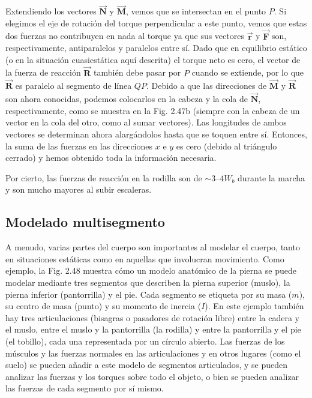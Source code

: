 \documentclass[12pt]{book}
\begin{document}
Extendiendo los vectores $\vec{\mathbf{N}}$ y $\vec{\mathbf{M}}$, vemos que se intersectan en el punto $P$. Si elegimos el eje de rotación del torque perpendicular a este punto, vemos que estas dos fuerzas no contribuyen en nada al torque ya que sus vectores $\vec{\mathbf{r}}$ y $\vec{\mathbf{F}}$ son, respectivamente, antiparalelos y paralelos entre sí. Dado que en equilibrio estático (o en la situación cuasiestática aquí descrita) el torque neto es cero, el vector de la fuerza de reacción $\vec{\mathbf{R}}$ también debe pasar por $P$ cuando se extiende, por lo que $\vec{\mathbf{R}}$ es paralelo al segmento de línea $QP$. Debido a que las direcciones de $\vec{\mathbf{M}}$ y $\vec{\mathbf{R}}$ son ahora conocidas, podemos colocarlos en la cabeza y la cola de $\vec{\mathbf{N}}$, respectivamente, como se muestra en la Fig. 2.47b (siempre con la cabeza de un vector en la cola del otro, como al sumar vectores). Las longitudes de ambos vectores se determinan ahora alargándolos hasta que se toquen entre sí. Entonces, la suma de las fuerzas en las direcciones $x$ e $y$ es cero (debido al triángulo cerrado) y hemos obtenido toda la información necesaria.

Por cierto, las fuerzas de reacción en la rodilla son de $\sim 3\text{--}4 W_b$ durante la marcha \cite{24} y son mucho mayores al subir escaleras.

\subsection{Modelado multisegmento}

A menudo, varias partes del cuerpo son importantes al modelar el cuerpo, tanto en situaciones estáticas como en aquellas que involucran movimiento. Como ejemplo, la Fig. 2.48 muestra cómo un modelo anatómico de la pierna se puede modelar mediante tres segmentos que describen la pierna superior (muslo), la pierna inferior (pantorrilla) y el pie. Cada segmento se etiqueta por su masa ($m$), su centro de masa (punto) y su momento de inercia ($I$). En este ejemplo también hay tres articulaciones (bisagras o pasadores de rotación libre) entre la cadera y el muslo, entre el muslo y la pantorrilla (la rodilla) y entre la pantorrilla y el pie (el tobillo), cada una representada por un círculo abierto. Las fuerzas de los músculos y las fuerzas normales en las articulaciones y en otros lugares (como el suelo) se pueden añadir a este modelo de segmentos articulados, y se pueden analizar las fuerzas y los torques sobre todo el objeto, o bien se pueden analizar las fuerzas de cada segmento por sí mismo.
\end{document}
